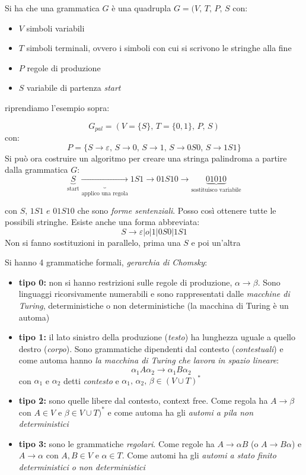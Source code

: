 \documentclass[a4paper,12pt, oneside]{book}
\begin{document}
Si ha che una grammatica $G$ è una quadrupla $G=(V,\,T,\,P,\,S$ con:
\begin{itemize}
\item $V$ simboli variabili
\item $T$ simboli terminali, ovvero i simboli con cui si scrivono le stringhe alla fine
\item $P$ regole di produzione
\item $S$ variabile di partenza \textit{start}
\end{itemize}
riprendiamo l'esempio sopra:
\begin{esempio}
$$G_{pal}=(V=\{S\},\, T=\{0, 1\},\, P,\, S)$$
con:
$$P=\{S\to\varepsilon,\, S\to 0,\, S\to 1,\, S\to 0S0,\, S\to 1S1\}$$
Si può ora costruire un algoritmo per creare una stringa palindroma a partire dalla grammatica $G$:
$$\underbrace{S}_{\mbox{start}}\underbrace{\to}_{\mbox{applico una regola}} 1S1 \to 01S10\to \underbrace{01010}_{\mbox{sostituisco variabile}}$$

con $S,\, 1S1\,\, e\,\, 01S10$ che sono \textit{forme sentenziali}. Posso così ottenere tutte le possibili stringhe. Esiste anche una forma abbreviata:
$$S\to \varepsilon|o|1|0S0|1S1$$
Non si fanno sostituzioni in parallelo, prima una $S$ e poi un'altra
\end{esempio}
Si hanno 4 grammatiche formali, \textit{gerarchia di Chomsky}:
\begin{itemize}
\item \textbf{tipo 0:} non si hanno restrizioni sulle regole di produzione, $\alpha\to\beta$. Sono linguaggi ricorsivamente numerabili e sono rappresentati dalle \textit{macchine di Turing}, deterministiche o non deterministiche (la macchina di Turing è un automa)
\item \textbf{tipo 1:}  il lato sinistro della produzione (\textit{testo}) ha lunghezza uguale a quello destro (\textit{corpo}). Sono grammatiche dipendenti dal contesto (\textit{contestuali}) e come automa hanno\textit{ la macchina di Turing che lavora in spazio lineare}:
$$\alpha_1A\alpha_2\to \alpha_1B\alpha_2$$
con $\alpha_1$ e $\alpha_2$ detti \textit{contesto} e $\alpha_1,\,\alpha_2,\, \beta\in (V\cup T)^*$
\item \textbf{tipo 2:} sono quelle libere dal contesto, context free. Come regola ha $A\to\beta$ con $A\in V$ e $\beta\in V\cup T)^*$ e come automa ha gli \textit{automi a pila non deterministici}
\item \textbf{tipo 3:} sono le grammatiche \textit{regolari}. Come regole ha $A\to\alpha B$ (o $A\to B\alpha$) e $A\to\alpha$  con $A,B\in V$ e $\alpha\in T$. Come automi ha gli \textit{automi a stato finito deterministici o non deterministici}
\end{itemize}
\end{document}
